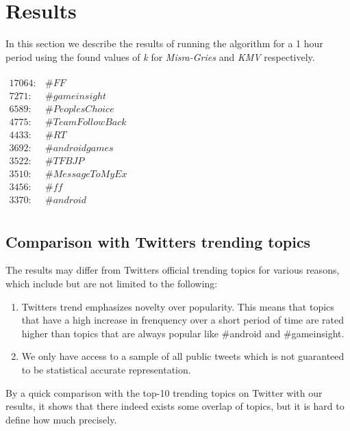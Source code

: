\section{Results}\label{results}
In this section we describe the results of running the algorithm for a 1 hour period using the found values of \textit{k} for \textit{Misra-Gries} and \textit{KMV} respectively.
\\\\
$\begin{array}{ll}
    17064: & \#FF \\
    7271: & \#gameinsight \\
    6589: & \#PeoplesChoice \\
    4775: & \#TeamFollowBack \\
    4433: & \#RT \\
    3692: & \#androidgames \\
    3522: & \#TFBJP \\
    3510: & \#MessageToMyEx \\
    3456: & \#ff \\
    3370: & \#android \\
\end{array}$

\subsection{Comparison with Twitters trending topics}\label{twitter-result}
The results may differ from Twitters official trending topics for various reasons, which include but are not limited to the following: 
\\
\begin{enumerate}
	\item Twitters trend emphasizes novelty over popularity. This means that topics that have a high increase in frenquency over a short period of time are rated higher than topics that are always popular like \#android and \#gameinsight. 
	\item We only have access to a sample of all public tweets which is not guaranteed to be statistical accurate representation.
\end{enumerate}

By a quick comparison with the top-10 trending topics on Twitter with our results, it shows that there indeed exists some overlap of topics, but it is hard to define how much precisely.


